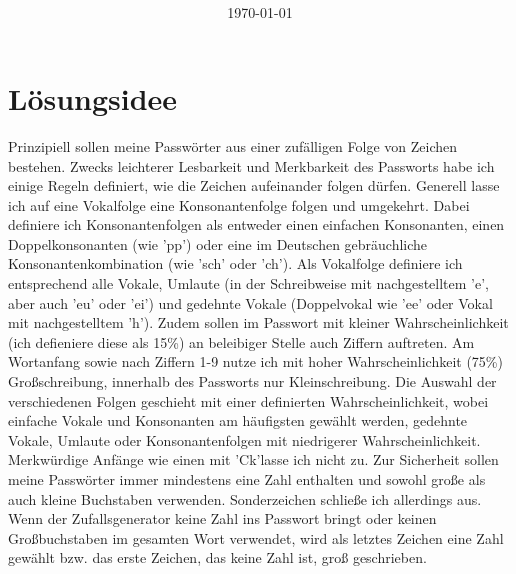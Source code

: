 \documentclass[a4paper,10pt,ngerman]{scrartcl}
\title{\textbf{\Huge\Aufgabe}}
\author{\LARGE \Namen\\\\}
\date{\LARGE\today}
\begin{document}
\maketitle
\tableofcontents

\vspace{0.5cm}

\section{Lösungsidee}
Prinzipiell sollen meine Passwörter aus einer zufälligen Folge von Zeichen bestehen. Zwecks leichterer Lesbarkeit und Merkbarkeit des Passworts habe ich einige Regeln definiert, wie die Zeichen aufeinander folgen dürfen. Generell lasse ich auf eine Vokalfolge eine Konsonantenfolge folgen und umgekehrt. Dabei definiere ich Konsonantenfolgen als entweder einen einfachen Konsonanten, einen Doppelkonsonanten (wie 'pp') oder eine im Deutschen gebräuchliche Konsonantenkombination (wie 'sch' oder 'ch'). Als Vokalfolge definiere ich entsprechend alle Vokale, Umlaute (in der Schreibweise mit nachgestelltem 'e', aber auch 'eu' oder 'ei') und gedehnte Vokale (Doppelvokal wie 'ee' oder Vokal mit nachgestelltem 'h'). 
Zudem sollen im Passwort mit kleiner Wahrscheinlichkeit (ich defieniere diese als 15\%) an beleibiger Stelle auch Ziffern auftreten. Am Wortanfang sowie nach Ziffern 1-9 nutze ich mit hoher Wahrscheinlichkeit (75\%) Großschreibung, innerhalb des Passworts nur Kleinschreibung. Die Auswahl der verschiedenen Folgen geschieht mit einer definierten Wahrscheinlichkeit, wobei einfache Vokale und Konsonanten am häufigsten gewählt werden, gedehnte Vokale, Umlaute oder Konsonantenfolgen mit niedrigerer Wahrscheinlichkeit. 
Merkwürdige Anfänge wie einen mit 'Ck'lasse ich nicht zu. 
Zur Sicherheit sollen meine Passwörter immer mindestens eine Zahl enthalten und sowohl große als auch kleine Buchstaben verwenden. Sonderzeichen schließe ich allerdings aus. Wenn der Zufallsgenerator keine Zahl ins Passwort bringt oder keinen Großbuchstaben im gesamten Wort verwendet, wird als letztes Zeichen eine Zahl gewählt bzw. das erste Zeichen, das keine Zahl ist, groß geschrieben. 
\end{document}
